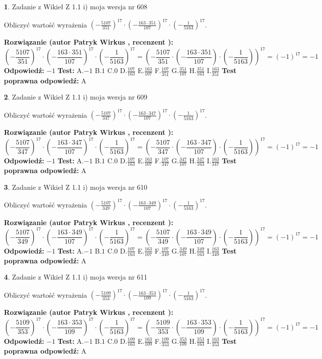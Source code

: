 \documentclass[12pt, a4paper]{article}
\theoremstyle{definition} %
\newtheorem{zad}{}
\newcommand{\zadStart}[1]{\begin{zad}#1\newline}
\newcommand{\zadStop}{\end{zad}}
\newcommand{\rozwStart}[2]{\noindent \textbf{Rozwiązanie (autor #1 , recenzent #2): }\newline}
\newcommand{\rozwStop}{\newline}
\newcommand{\odpStart}{\noindent \textbf{Odpowiedź:}\newline}
\newcommand{\odpStop}{\newline}
\newcommand{\testStart}{\noindent \textbf{Test:}\newline}
\newcommand{\testStop}{\newline}
\newcommand{\kluczStart}{\noindent \textbf{Test poprawna odpowiedź:}\newline}
\newcommand{\kluczStop}{\newline}
\begin{document}
\zadStart{Zadanie z Wikieł Z 1.1 i) moja wersja nr 608}

Obliczyć wartość wyrażenia $(-\frac{5107}{351})^{17} \cdot (-\frac{163 \cdot 351}{107})^{17} \cdot (-\frac{1}{5163})^{17}$.
\zadStop
\rozwStart{Patryk Wirkus}{}
$$(-\frac{5107}{351})^{17} \cdot (-\frac{163 \cdot 351}{107})^{17} \cdot (-\frac{1}{5163})^{17} = (-\frac{5107}{351} \cdot (-\frac{163 \cdot 351}{107}) \cdot (-\frac{1}{5163}))^{17} = (-1)^{17} = -1$$
\rozwStop
\odpStart
$-1$
\odpStop
\testStart
A.$-1$ B.$1$ C.$0$ D.$\frac{107}{163}$ E.$\frac{163}{107}$
F.$\frac{107}{351}$ G.$\frac{351}{107}$
H.$\frac{351}{163}$
I.$\frac{163}{351}$
\testStop
\kluczStart
A
\kluczStop



\zadStart{Zadanie z Wikieł Z 1.1 i) moja wersja nr 609}

Obliczyć wartość wyrażenia $(-\frac{5107}{347})^{17} \cdot (-\frac{163 \cdot 347}{107})^{17} \cdot (-\frac{1}{5163})^{17}$.
\zadStop
\rozwStart{Patryk Wirkus}{}
$$(-\frac{5107}{347})^{17} \cdot (-\frac{163 \cdot 347}{107})^{17} \cdot (-\frac{1}{5163})^{17} = (-\frac{5107}{347} \cdot (-\frac{163 \cdot 347}{107}) \cdot (-\frac{1}{5163}))^{17} = (-1)^{17} = -1$$
\rozwStop
\odpStart
$-1$
\odpStop
\testStart
A.$-1$ B.$1$ C.$0$ D.$\frac{107}{163}$ E.$\frac{163}{107}$
F.$\frac{107}{347}$ G.$\frac{347}{107}$
H.$\frac{347}{163}$
I.$\frac{163}{347}$
\testStop
\kluczStart
A
\kluczStop



\zadStart{Zadanie z Wikieł Z 1.1 i) moja wersja nr 610}

Obliczyć wartość wyrażenia $(-\frac{5107}{349})^{17} \cdot (-\frac{163 \cdot 349}{107})^{17} \cdot (-\frac{1}{5163})^{17}$.
\zadStop
\rozwStart{Patryk Wirkus}{}
$$(-\frac{5107}{349})^{17} \cdot (-\frac{163 \cdot 349}{107})^{17} \cdot (-\frac{1}{5163})^{17} = (-\frac{5107}{349} \cdot (-\frac{163 \cdot 349}{107}) \cdot (-\frac{1}{5163}))^{17} = (-1)^{17} = -1$$
\rozwStop
\odpStart
$-1$
\odpStop
\testStart
A.$-1$ B.$1$ C.$0$ D.$\frac{107}{163}$ E.$\frac{163}{107}$
F.$\frac{107}{349}$ G.$\frac{349}{107}$
H.$\frac{349}{163}$
I.$\frac{163}{349}$
\testStop
\kluczStart
A
\kluczStop



\zadStart{Zadanie z Wikieł Z 1.1 i) moja wersja nr 611}

Obliczyć wartość wyrażenia $(-\frac{5109}{353})^{17} \cdot (-\frac{163 \cdot 353}{109})^{17} \cdot (-\frac{1}{5163})^{17}$.
\zadStop
\rozwStart{Patryk Wirkus}{}
$$(-\frac{5109}{353})^{17} \cdot (-\frac{163 \cdot 353}{109})^{17} \cdot (-\frac{1}{5163})^{17} = (-\frac{5109}{353} \cdot (-\frac{163 \cdot 353}{109}) \cdot (-\frac{1}{5163}))^{17} = (-1)^{17} = -1$$
\rozwStop
\odpStart
$-1$
\odpStop
\testStart
A.$-1$ B.$1$ C.$0$ D.$\frac{109}{163}$ E.$\frac{163}{109}$
F.$\frac{109}{353}$ G.$\frac{353}{109}$
H.$\frac{353}{163}$
I.$\frac{163}{353}$
\testStop
\kluczStart
A
\kluczStop
\end{document}
